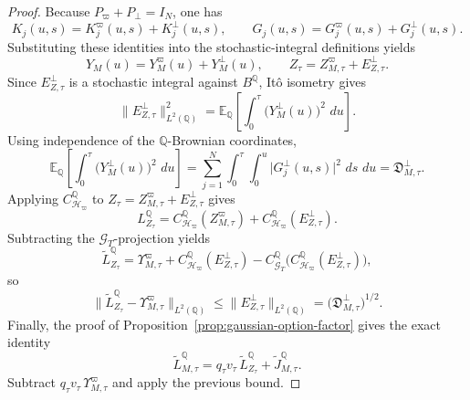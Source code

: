 \documentclass[11pt,a4paper]{amsart}
\theoremstyle{plain}
\theoremstyle{definition}
\theoremstyle{remark}
\newcommand{\QQ}{\mathbb{Q}}
\newcommand{\EE}{\mathbb{E}}
\newcommand{\cG}{\mathcal{G}}
\newcommand{\cH}{\mathcal{H}}
\newcommand{\dd}{\,d}
\begin{document}
\begin{proof}
Because \(P_\varpi+P_\perp=I_N\), one has
\[
        K_j(u,s)=K_j^\varpi(u,s)+K_j^\perp(u,s),
        \qquad
        G_j(u,s)=G_j^\varpi(u,s)+G_j^\perp(u,s).
\]
Substituting these identities into the stochastic-integral definitions yields
\[
        Y_M(u)=Y_M^\varpi(u)+Y_M^\perp(u),
        \qquad
        Z_\tau=Z_{M,\tau}^\varpi+E_{Z,\tau}^\perp.
\]
Since \(E_{Z,\tau}^\perp\) is a stochastic integral against \(B^\QQ\), It\^o isometry gives
\[
        \|E_{Z,\tau}^\perp\|_{L^2(\QQ)}^2
        =
        \EE_\QQ\!\left[
                \int_0^\tau \bigl(Y_M^\perp(u)\bigr)^2\,\dd u
        \right].
\]
Using independence of the \(\QQ\)-Brownian coordinates,
\[
        \EE_\QQ\!\left[
                \int_0^\tau \bigl(Y_M^\perp(u)\bigr)^2\,\dd u
        \right]
        =
        \sum_{j=1}^N \int_0^\tau \int_0^u
        \bigl|G_j^\perp(u,s)\bigr|^2\,\dd s\,\dd u
        =
        \mathfrak D_{M,\tau}^\perp.
\]
Applying \(C_{\cH_\varpi}^\QQ\) to \(Z_\tau=Z_{M,\tau}^\varpi+E_{Z,\tau}^\perp\) gives
\[
        L_{Z_\tau}^\QQ
        =
        C_{\cH_\varpi}^\QQ(Z_{M,\tau}^\varpi)
        +
        C_{\cH_\varpi}^\QQ(E_{Z,\tau}^\perp).
\]
Subtracting the \(\cG_T\)-projection yields
\[
        \widetilde L_{Z_\tau}^\QQ
        =
        \Upsilon_{M,\tau}^\varpi
        +
        C_{\cH_\varpi}^\QQ(E_{Z,\tau}^\perp)
        -
        C_{\cG_T}^\QQ\bigl(C_{\cH_\varpi}^\QQ(E_{Z,\tau}^\perp)\bigr),
\]
so
\[
        \|\widetilde L_{Z_\tau}^\QQ-\Upsilon_{M,\tau}^\varpi\|_{L^2(\QQ)}
        \le
        \|E_{Z,\tau}^\perp\|_{L^2(\QQ)}
        =
        \bigl(\mathfrak D_{M,\tau}^\perp\bigr)^{1/2}.
\]
Finally, the proof of Proposition~\ref{prop:gaussian-option-factor} gives the exact identity
\[
        \widetilde L_{M,\tau}^\QQ
        =
        q_\tau v_\tau\,\widetilde L_{Z_\tau}^\QQ
        +
        \widetilde J_{M,\tau}^\QQ.
\]
Subtract \(q_\tau v_\tau\,\Upsilon_{M,\tau}^\varpi\) and apply the previous bound.
\end{proof}
\end{document}

